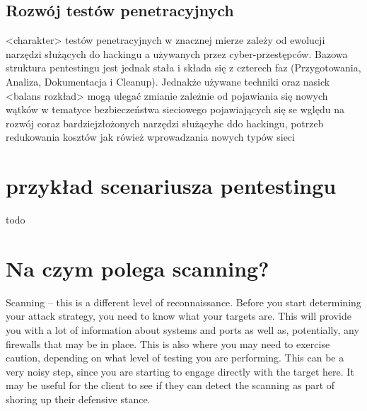 



\subsection{Rozwój testów penetracyjnych}

<charakter> testów penetracyjnych w znacznej mierze zależy od ewolucji narzędzi służących do hackingu a używanych przez cyber-przestępców. Bazowa struktura pentestingu jest jednak stała i składa się z czterech faz (Przygotowania, Analiza, Dokumentacja i Cleanup). Jednakże używane techniki oraz nasick <balans rozkład> mogą ulegać zmianie zależnie od pojawiania się nowych wątków w tematyce bezbieczeństwa sieciowego pojawiających się se wględu na rozwój coraz bardziejzłożonych narzędzi służącyhc ddo hackingu, potrzeb redukowania kosztów jak rówież wprowadzania nowych typów sieci




\section{przykład scenariusza pentestingu}
\label{sec:zawartoscPracy}

todo



\section{Na czym polega scanning?}

Scanning – this is a different level of reconnaissance. Before
you start determining your attack strategy, you need to know
what your targets are. This will provide you with a lot of
information about systems and ports as well as, potentially,
any firewalls that may be in place. This is also where you may
need to exercise caution, depending on what level of testing
you are performing. This can be a very noisy step, since you
are starting to engage directly with the target here. It may be
useful for the client to see if they can detect the scanning as
part of shoring up their defensive stance.

